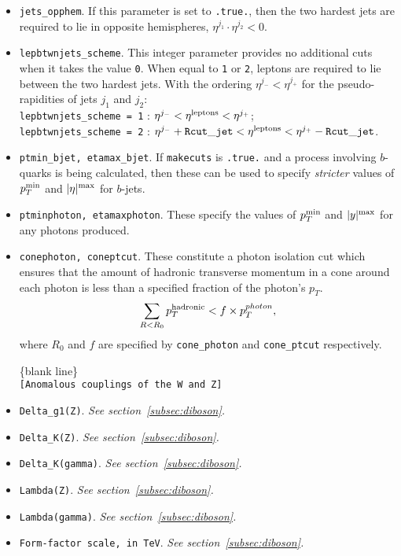\documentclass[12pt]{article}
\begin{document}
\begin{itemize}
\item {\tt jets\_opphem}. If this parameter is set to {\tt .true.},
then the two hardest jets are required to lie in opposite hemispheres,
$\eta^{j_1} \cdot \eta^{j_2} < 0$.

\item {\tt lepbtwnjets\_scheme}. This integer parameter provides no
additional cuts when it takes the value {\tt 0}. When equal to
{\tt 1} or {\tt 2}, leptons are required to lie between the two
hardest jets. With the ordering $\eta^{j_-} < \eta^{j_+}$ for the
pseudo-rapidities of jets $j_1$ and $j_2$: \\
{\tt lepbtwnjets\_scheme = 1} : 
 $\eta^{j_-} < \eta^{\rm leptons} < \eta^{j_+}$; \\
{\tt lepbtwnjets\_scheme = 2} :
 $\eta^{j_-}+{\tt Rcut\_jet} < \eta^{\rm leptons} < \eta^{j_+}-{\tt Rcut\_jet}$.

\item {\tt ptmin\_bjet,  etamax\_bjet}. If {\tt makecuts} is {\tt .true.}
and a process involving $b$-quarks is being calculated, then these can
be used to specify {\em stricter} values of $p_T^{\rm min}$
and $|\eta|^{\rm max}$ for $b$-jets.

\item {\tt ptminphoton, etamaxphoton}. These specify the values
of $p_T^{\rm min}$ and $|y|^{\rm max}$ for any photons produced.

\item {\tt conephoton, coneptcut}. These constitute a photon isolation
cut which ensures that the amount of hadronic
transverse momentum in a cone around each photon is less than
a specified fraction of the photon's $p_T$.
\begin{displaymath}
\sum_{R < R_0} p_T^{\rm hadronic} < f \times p_T^{photon},
\end{displaymath}
where $R_0$ and $f$ are specified by {\tt cone\_photon} and
{\tt cone\_ptcut} respectively.

\begin{center}
\{blank line\} \\
{\tt [Anomalous couplings of the W and Z] }
\end{center}

\item {\tt Delta\_g1(Z)}. {\it See section~\ref{subsec:diboson}.}
\item {\tt Delta\_K(Z)}. {\it See section~\ref{subsec:diboson}.}
\item {\tt Delta\_K(gamma)}. {\it See section~\ref{subsec:diboson}.}
\item {\tt Lambda(Z)}. {\it See section~\ref{subsec:diboson}.}
\item {\tt Lambda(gamma)}. {\it See section~\ref{subsec:diboson}.}
\item {\tt Form-factor scale, in TeV}. {\it See section~\ref{subsec:diboson}.}


\end{itemize}
\end{document}
